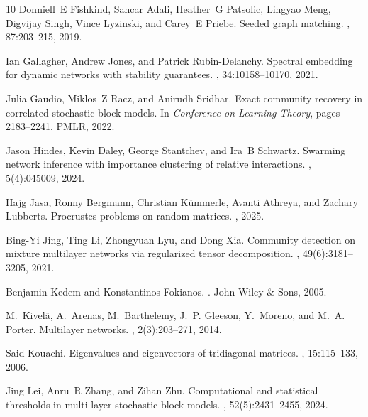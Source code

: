 \documentclass[12pt]{article}
\theoremstyle{definition}
\begin{document}
\begin{thebibliography}{10}
Donniell~E Fishkind, Sancar Adali, Heather~G Patsolic, Lingyao Meng, Digvijay Singh, Vince Lyzinski, and Carey~E Priebe.
\newblock Seeded graph matching.
, 87:203--215, 2019.

Ian Gallagher, Andrew Jones, and Patrick Rubin-Delanchy.
\newblock Spectral embedding for dynamic networks with stability guarantees.
, 34:10158--10170, 2021.

Julia Gaudio, Miklos~Z Racz, and Anirudh Sridhar.
\newblock Exact community recovery in correlated stochastic block models.
\newblock In {\em Conference on Learning Theory}, pages 2183--2241. PMLR, 2022.

Jason Hindes, Kevin Daley, George Stantchev, and Ira~B Schwartz.
\newblock Swarming network inference with importance clustering of relative interactions.
, 5(4):045009, 2024.

Hajg Jasa, Ronny Bergmann, Christian K{\"u}mmerle, Avanti Athreya, and Zachary Lubberts.
\newblock Procrustes problems on random matrices.
, 2025.

Bing-Yi Jing, Ting Li, Zhongyuan Lyu, and Dong Xia.
\newblock Community detection on mixture multilayer networks via regularized tensor decomposition.
, 49(6):3181--3205, 2021.

Benjamin Kedem and Konstantinos Fokianos.
.
\newblock John Wiley \& Sons, 2005.

M.~Kivel{\"a}, A.~Arenas, M.~Barthelemy, J.~P. Gleeson, Y.~Moreno, and M.~A. Porter.
\newblock Multilayer networks.
, 2(3):203--271, 2014.

Said Kouachi.
\newblock Eigenvalues and eigenvectors of tridiagonal matrices.
, 15:115--133, 2006.

Jing Lei, Anru~R Zhang, and Zihan Zhu.
\newblock Computational and statistical thresholds in multi-layer stochastic block models.
, 52(5):2431--2455, 2024.


\end{thebibliography}
\end{document}
